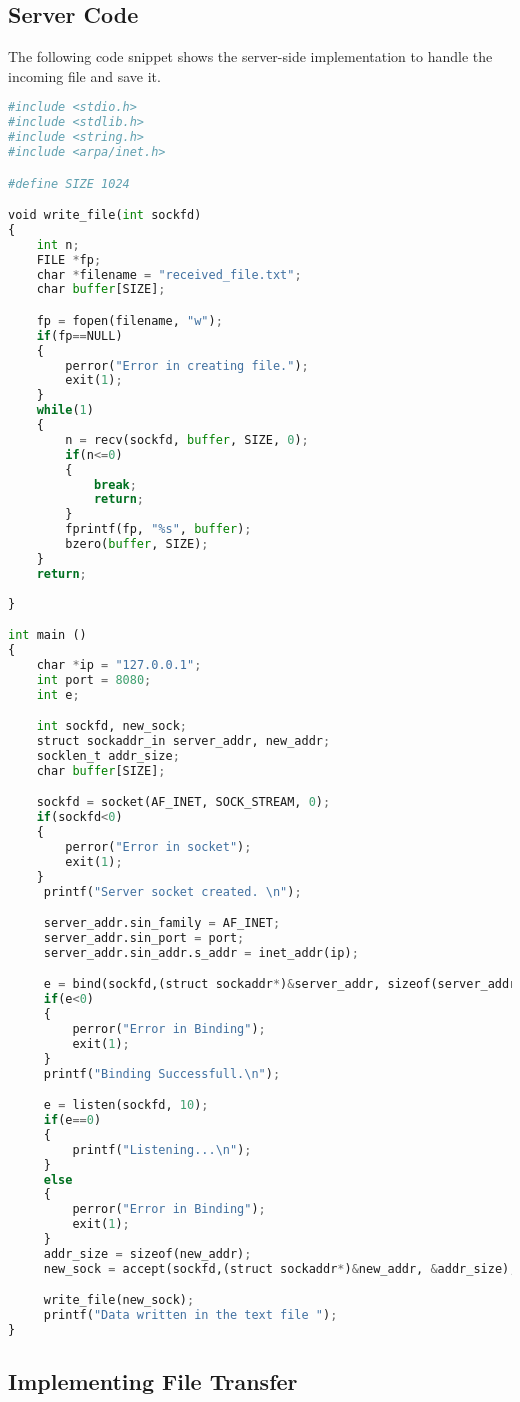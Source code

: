 \documentclass[a4paper,12pt]{article}
\begin{document}
\subsection{Server Code}
The following code snippet shows the server-side implementation to handle the incoming file and save it.

\begin{lstlisting}[language=Python, caption=Server Code for File Transfer]
#include <stdio.h>
#include <stdlib.h>
#include <string.h>
#include <arpa/inet.h>

#define SIZE 1024

void write_file(int sockfd)
{
    int n; 
    FILE *fp;
    char *filename = "received_file.txt";
    char buffer[SIZE];

    fp = fopen(filename, "w");
    if(fp==NULL)
    {
        perror("Error in creating file.");
        exit(1);
    }
    while(1)
    {
        n = recv(sockfd, buffer, SIZE, 0);
        if(n<=0)
        {
            break;
            return;
        }
        fprintf(fp, "%s", buffer);
        bzero(buffer, SIZE);
    }
    return;
    
}

int main ()
{
    char *ip = "127.0.0.1";
    int port = 8080;
    int e;

    int sockfd, new_sock;
    struct sockaddr_in server_addr, new_addr;
    socklen_t addr_size;
    char buffer[SIZE];

    sockfd = socket(AF_INET, SOCK_STREAM, 0);
    if(sockfd<0)
    {
        perror("Error in socket");
        exit(1);
    }
     printf("Server socket created. \n");

     server_addr.sin_family = AF_INET;
     server_addr.sin_port = port;
     server_addr.sin_addr.s_addr = inet_addr(ip);

     e = bind(sockfd,(struct sockaddr*)&server_addr, sizeof(server_addr));
     if(e<0)
     {
         perror("Error in Binding");
         exit(1);
     }
     printf("Binding Successfull.\n");

     e = listen(sockfd, 10);
     if(e==0)
     {
         printf("Listening...\n");
     }
     else 
     {
         perror("Error in Binding");
         exit(1);
     }
     addr_size = sizeof(new_addr);
     new_sock = accept(sockfd,(struct sockaddr*)&new_addr, &addr_size);

     write_file(new_sock);
     printf("Data written in the text file ");
}
\end{lstlisting}

\subsection{Implementing File Transfer}
\end{document}
